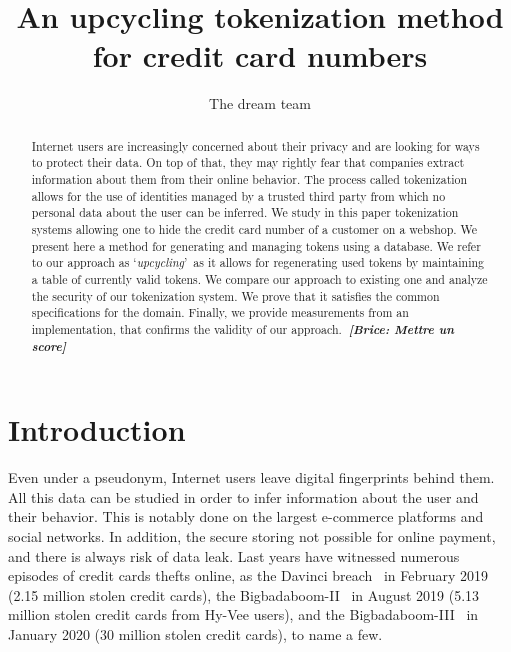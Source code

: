 \documentclass{llncs}
\newcounter{prob}
\newcommand{\br}[1]{\emph{\bf \color{green}~[Brice: #1]}}
\begin{document}
\pagestyle{plain}
\title{An upcycling tokenization method for credit card numbers}
\author{The dream team}
\maketitle


\begin{abstract}
Internet users are increasingly concerned about their privacy and are looking for ways to protect their data. On top of that, they may rightly fear that companies extract information about them from their online behavior. The process called tokenization allows for the use of identities managed by a trusted third party from which no personal data about the user can be inferred.
We study in this paper tokenization systems allowing one to hide the credit card number of a customer on a webshop. We present here a method for generating and managing tokens using a database. We refer to our approach as \lq\textit{upcycling}\rq~as it allows for regenerating used tokens by maintaining a table of currently valid tokens.
We compare our approach to existing one and analyze the security of our tokenization system. We prove that it satisfies the common specifications for the domain. Finally, we provide measurements from an implementation, that confirms the validity of our approach.\br{Mettre un score}
\end{abstract}


\section{Introduction}
Even under a pseudonym, Internet users leave digital fingerprints behind them. All this data can be studied in order to infer information about the user and their behavior. This is notably done on the largest e-commerce platforms and social networks. In addition, the secure storing not possible for online payment, and there is always risk of data leak. Last years have witnessed numerous episodes of credit cards thefts online, as the Davinci breach~\cite{Krebs2019} in February 2019 (2.15 million stolen credit cards), the Bigbadaboom-II~\cite{Thales2018} in August 2019 (5.13 million stolen credit cards from Hy-Vee users), and the Bigbadaboom-III~\cite{Secureworld2020} in January 2020 (30 million stolen credit cards), to name a few.
\end{document}
